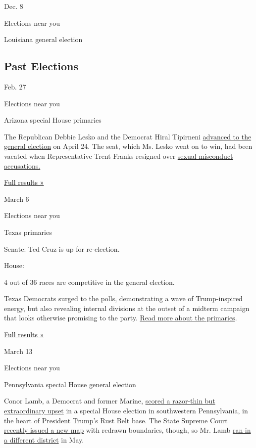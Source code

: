 Dec. 8

Elections near you

Louisiana general election

\hypertarget{past-elections}{%
\subsection{Past Elections}\label{past-elections}}

Feb. 27

Elections near you

Arizona special House primaries

The Republican Debbie Lesko and the Democrat Hiral Tipirneni
\href{https://www.nytimes3xbfgragh.onion/2018/03/28/us/arizona-race-trump-stormy-daniels-lesko-tipirneni.html}{advanced
to the general election} on April 24. The seat, which Ms. Lesko went on
to win, had been vacated when Representative Trent Franks resigned over
\href{https://www.nytimes3xbfgragh.onion/2017/12/08/us/politics/trent-franks-sexual-surrogacy-harassment.html}{sexual
misconduct accusations.}

\href{https://www.nytimes3xbfgragh.onion/elections/results/arizona-house-special-election-primary}{Full
results »}

March 6

Elections near you

Texas primaries

Senate: Ted Cruz is up for re-election.

House:

4 out of 36 races are competitive in the general election.

Texas Democrats surged to the polls, demonstrating a wave of
Trump-inspired energy, but also revealing internal divisions at the
outset of a midterm campaign that looks otherwise promising to the
party.
\href{https://www.nytimes3xbfgragh.onion/2018/03/07/us/politics/texas-primary-race-trump.html}{Read
more about the primaries}.

\href{https://www.nytimes3xbfgragh.onion/elections/results/texas-primary-election}{Full
results »}

March 13

Elections near you

Pennsylvania special House general election

Conor Lamb, a Democrat and former Marine,
\href{https://www.nytimes3xbfgragh.onion/2018/03/14/us/politics/democrats-republicans-pennsylvania-special-election.html}{scored
a razor-thin but extraordinary upset} in a special House election in
southwestern Pennsylvania, in the heart of President Trump's Rust Belt
base. The State Supreme Court
\href{https://www.nytimes3xbfgragh.onion/interactive/2018/02/19/upshot/pennsylvania-new-house-districts-gerrymandering.html}{recently
issued a new map} with redrawn boundaries, though, so Mr. Lamb
\href{https://www.nytimes3xbfgragh.onion/2018/03/30/us/midterm-elections-pennsylvania.html}{ran
in a different district} in May.

